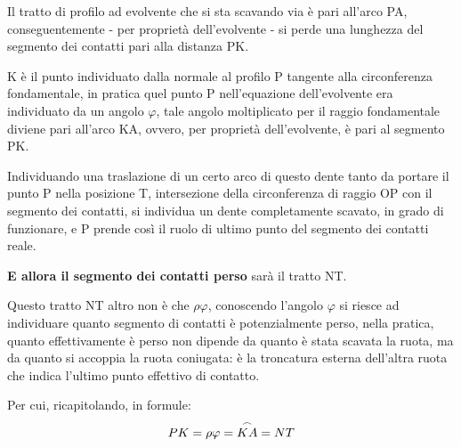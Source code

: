 \documentclass[a4paper, 15pt]{article}
\begin{document}
\begin{adjustwidth}{2in}{}
		Il tratto di profilo ad evolvente che si sta scavando via è pari all'arco PA, conseguentemente - per proprietà dell'evolvente - si perde una lunghezza del segmento dei contatti pari alla distanza PK.  
		
		K è il punto  individuato dalla normale al profilo P tangente alla circonferenza fondamentale, in pratica quel punto P nell'equazione dell'evolvente era individuato da un angolo $\varphi$, tale angolo moltiplicato per il raggio fondamentale diviene pari all'arco KA, ovvero, per proprietà dell'evolvente, è pari al segmento PK. 
		
		Individuando una traslazione di un certo arco di questo dente tanto da portare il punto P nella posizione T, intersezione della circonferenza di raggio OP con il segmento dei contatti, si individua un dente completamente scavato, in grado di funzionare, e P prende così il ruolo di ultimo punto del segmento dei contatti reale.  
		
		\textbf{E allora il segmento dei contatti perso} sarà il tratto NT. \newline 
		
		Questo tratto NT altro non è che $\rho\varphi$, conoscendo l'angolo $\varphi$ si riesce ad individuare quanto segmento di contatti è potenzialmente perso, nella pratica, quanto effettivamente è perso non dipende da quanto è stata scavata la ruota, ma da quanto si accoppia la ruota coniugata: è la troncatura esterna dell'altra ruota che indica l'ultimo punto  effettivo di contatto. 
		
		Per cui, ricapitolando, in formule: 
		\[PK = \rho\varphi = \overset{\huge\frown}{KA} = NT\] 
\end{adjustwidth}		
\end{document}
